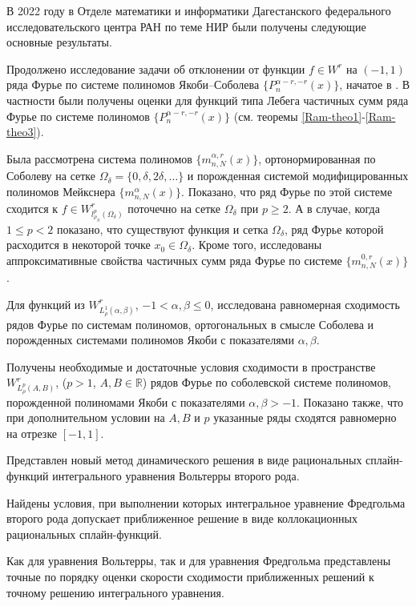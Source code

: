 \Conclusion

В 2022 году в Отделе математики и информатики Дагестанского федерального иссле\-довательского центра РАН по теме НИР были получены следующие основные результаты.


Продолжено исследование задачи об отклонении от функции $f\in W^r$ на $(-1,1)$ ряда Фурье по системе полиномов Якоби--Соболева $\{P_n^{\alpha-r,-r}(x)\}$, начатое в \cite{Ram-SharMN}. В частности были получены оценки для функций типа Лебега частичных сумм ряда Фурье по системе полиномов $\{P_n^{\alpha-r,-r}(x)\}$ (см. теоремы \ref{Ram-theo1}-\ref{Ram-theo3}).

Была рассмотрена система полиномов $\{m_{n,N}^{\alpha,r}(x)\}$, ортонормированная по Соболеву на сетке $\Omega_\delta=\{0, \delta, 2\delta, \ldots\}$ и порожденная системой модифицированных полиномов Мейкснера $\{m_{n,N}^{\alpha}(x)\}$. Показано, что ряд Фурье по этой системе сходится к $f\in W^r_{l^p_{\rho_N}(\Omega_\delta)}$ поточечно на сетке $\Omega_\delta$ при $p\ge2$. А в случае, когда $1\le p<2$ показано, что существуют функция и сетка $\Omega_\delta$, ряд Фурье которой расходится в некоторой точке $x_0\in\Omega_\delta$. Кроме того, исследованы аппроксимативные свойства частичных сумм ряда Фурье по системе $\{m_{n,N}^{0,r}(x)\}$.


Для функций из $W^r_{L^1_\rho(\alpha,\beta)}$, $-1 <\alpha, \beta  \le 0$, исследована равномерная сходимость рядов Фурье по системам полиномов, ортогональных в смысле Соболева и порожденных системами полиномов Якоби с показателями $\alpha, \beta$.

Получены необходимые и достаточные условия сходимости в пространстве $W^r_{L^p_\rho(A,B)}$, ($p > 1$, $A, B \in \mathbb{R}$) рядов Фурье по соболевской системе полиномов, порожденной полиномами Якоби с показателями $\alpha, \beta  > -1$. Показано также, что при дополнительном условии на $A, B$ и $p$ указанные ряды сходятся равномерно на отрезке $[-1,1]$.


Представлен новый метод динамического решения в виде рациональных
сплайн-функций интегрального уравнения Вольтерры второго рода.

Найдены условия, при выполнении которых интегральное уравнение
Фредгольма второго рода допускает приближенное решение в виде
коллокационных рациональных сплайн-функций.

Как для уравнения Вольтерры, так и для уравнения Фредгольма
представлены точные по порядку оценки скорости сходимости
приближенных решений к точному решению интегрального уравнения.

